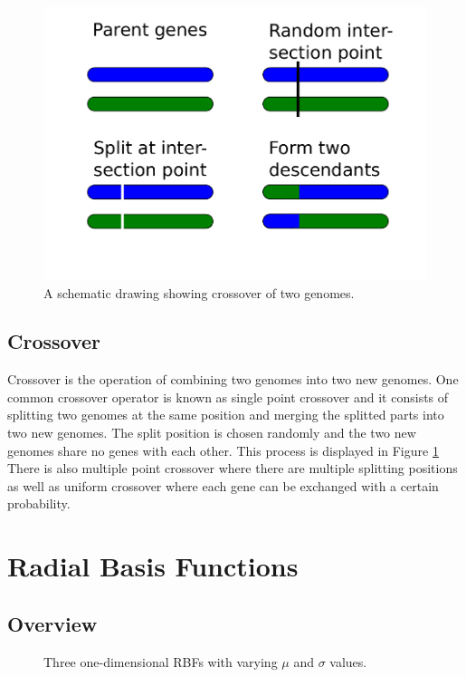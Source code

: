 \documentclass[a4paper,11pt]{kth-mag}
\begin{document}
\begin{figure}
\centering\includegraphics[scale=0.5]{crossover}
\caption{A schematic drawing showing crossover of two genomes.}
\label{crossover-figure}
\end{figure}

\subsection{Crossover}
Crossover is the operation of combining two genomes into two new genomes. One common crossover operator is known as  single point crossover and it consists of splitting two genomes at the same position and merging the splitted parts into two new genomes. The split position is chosen randomly and the two new genomes share no genes with each other. This process is displayed in Figure \ref{crossover-figure} There is also multiple point crossover where there are multiple splitting positions as well as uniform crossover where each gene can be exchanged with a certain probability.




\section{Radial Basis Functions}
\subsection{Overview}

\begin{figure}
\caption{Three one-dimensional RBFs with varying $\mu$ and $\sigma$ values.}
\end{figure}
\end{document}
